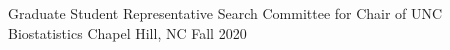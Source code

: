 

\begin{cvhonors}

  \cvhonor
    {Graduate Student Representative} %
    {Search Committee for Chair of UNC Biostatistics} %
    {Chapel Hill, NC} %
    {Fall 2020} %

  
  

\end{cvhonors}
